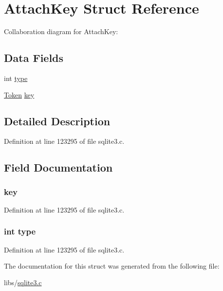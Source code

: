 \hypertarget{struct_attach_key}{}\section{Attach\+Key Struct Reference}
\label{struct_attach_key}


Collaboration diagram for Attach\+Key\+:
\subsection*{Data Fields}
\begin{DoxyCompactItemize}
\item 
int \hyperlink{struct_attach_key_ac765329451135abec74c45e1897abf26}{type}
\item 
\hyperlink{struct_token}{Token} \hyperlink{struct_attach_key_aef7a623895262ae2ba15a232b2fe8a6f}{key}
\end{DoxyCompactItemize}


\subsection{Detailed Description}


Definition at line 123295 of file sqlite3.\+c.



\subsection{Field Documentation}
\hypertarget{struct_attach_key_aef7a623895262ae2ba15a232b2fe8a6f}{}
\subsubsection[{key}]{ key}\label{struct_attach_key_aef7a623895262ae2ba15a232b2fe8a6f}


Definition at line 123295 of file sqlite3.\+c.

\hypertarget{struct_attach_key_ac765329451135abec74c45e1897abf26}{}
\subsubsection[{type}]{\setlength{\rightskip}{0pt plus 5cm}int type}\label{struct_attach_key_ac765329451135abec74c45e1897abf26}


Definition at line 123295 of file sqlite3.\+c.



The documentation for this struct was generated from the following file\+:\begin{DoxyCompactItemize}
\item 
libs/\hyperlink{sqlite3_8c}{sqlite3.\+c}\end{DoxyCompactItemize}
